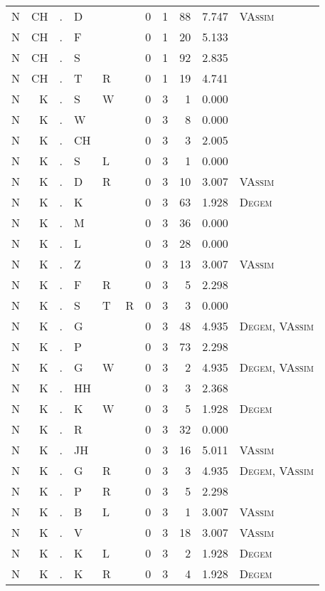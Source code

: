 \begin{longtable}{r@{ } r@{ } c@{ } l@{ } l@{ } l@{ } r r r r l }
N & CH & . & D &  &  & 0 & 1 & 88 & 7.747 & \textsc{VAssim} \\
N & CH & . & F &  &  & 0 & 1 & 20 & 5.133 &  \\
N & CH & . & S &  &  & 0 & 1 & 92 & 2.835 &  \\
N & CH & . & T & R &  & 0 & 1 & 19 & 4.741 &  \\
N & K & . & S & W &  & 0 & 3 & 1 & 0.000 &  \\
N & K & . & W &  &  & 0 & 3 & 8 & 0.000 &  \\
N & K & . & CH &  &  & 0 & 3 & 3 & 2.005 &  \\
N & K & . & S & L &  & 0 & 3 & 1 & 0.000 &  \\
N & K & . & D & R &  & 0 & 3 & 10 & 3.007 & \textsc{VAssim} \\
N & K & . & K &  &  & 0 & 3 & 63 & 1.928 & \textsc{Degem} \\
N & K & . & M &  &  & 0 & 3 & 36 & 0.000 &  \\
N & K & . & L &  &  & 0 & 3 & 28 & 0.000 &  \\
N & K & . & Z &  &  & 0 & 3 & 13 & 3.007 & \textsc{VAssim} \\
N & K & . & F & R &  & 0 & 3 & 5 & 2.298 &  \\
N & K & . & S & T & R & 0 & 3 & 3 & 0.000 &  \\
N & K & . & G &  &  & 0 & 3 & 48 & 4.935 & \textsc{Degem}, \textsc{VAssim} \\
N & K & . & P &  &  & 0 & 3 & 73 & 2.298 &  \\
N & K & . & G & W &  & 0 & 3 & 2 & 4.935 & \textsc{Degem}, \textsc{VAssim} \\
N & K & . & HH &  &  & 0 & 3 & 3 & 2.368 &  \\
N & K & . & K & W &  & 0 & 3 & 5 & 1.928 & \textsc{Degem} \\
N & K & . & R &  &  & 0 & 3 & 32 & 0.000 &  \\
N & K & . & JH &  &  & 0 & 3 & 16 & 5.011 & \textsc{VAssim} \\
N & K & . & G & R &  & 0 & 3 & 3 & 4.935 & \textsc{Degem}, \textsc{VAssim} \\
N & K & . & P & R &  & 0 & 3 & 5 & 2.298 &  \\
N & K & . & B & L &  & 0 & 3 & 1 & 3.007 & \textsc{VAssim} \\
N & K & . & V &  &  & 0 & 3 & 18 & 3.007 & \textsc{VAssim} \\
N & K & . & K & L &  & 0 & 3 & 2 & 1.928 & \textsc{Degem} \\
N & K & . & K & R &  & 0 & 3 & 4 & 1.928 & \textsc{Degem} \\

\end{longtable}
